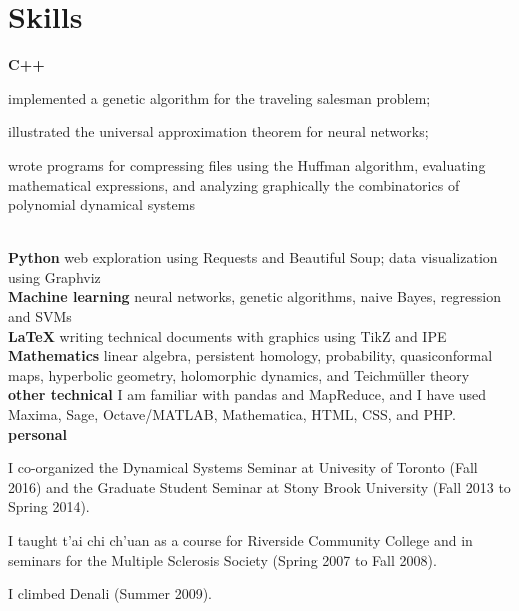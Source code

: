 \documentclass[11pt]{article}
\begin{document}
\section*{Skills}
\noindent\textbf{C++}
\begin{inparaenum}
\item implemented a genetic algorithm for the traveling salesman problem;
\item illustrated the universal approximation theorem for neural networks;
\item wrote programs for compressing files using the Huffman algorithm, evaluating mathematical expressions, and analyzing graphically the combinatorics of polynomial dynamical systems
\end{inparaenum}
\\
\noindent\textbf{Python} web exploration using Requests and Beautiful Soup; data visualization using Graphviz\\
\noindent\textbf{Machine learning} neural networks, genetic algorithms, naive Bayes, regression and SVMs\\
\noindent\textbf{\LaTeX} writing technical documents with graphics using TikZ and IPE\\
\noindent\textbf{Mathematics} linear algebra, persistent homology, probability, quasiconformal maps, hyperbolic geometry, holomorphic dynamics, and Teichmüller theory\\
\noindent\textbf{other technical} I am familiar with pandas and MapReduce, and I have used Maxima, Sage, Octave/MATLAB, Mathematica, HTML, CSS, and PHP.\\
\noindent\textbf{personal}
\begin{inparaitem}
\item I co-organized the Dynamical Systems Seminar at Univesity of Toronto (Fall 2016) and the Graduate
Student Seminar at Stony Brook University (Fall 2013 to Spring 2014).
\item I taught t’ai chi ch’uan as a
course for Riverside Community College and in seminars for the Multiple Sclerosis Society (Spring
2007 to Fall 2008).
\item I climbed Denali (Summer 2009).
\end{inparaitem}
\end{document}
